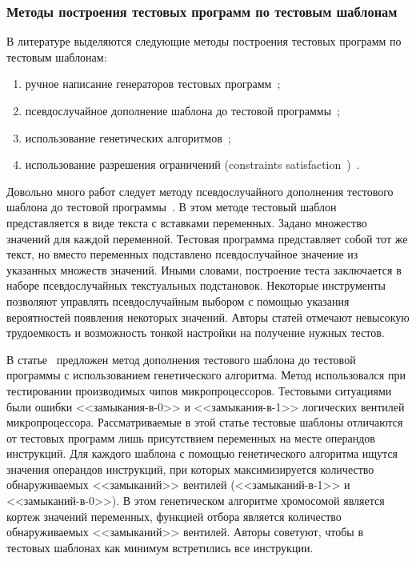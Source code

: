 \subsubsection{Методы построения тестовых программ по тестовым шаблонам}%

В литературе выделяются следующие методы построения тестовых программ по тестовым шаблонам:
\begin{enumerate}
	\item ручное написание генераторов тестовых программ~\cite{MicroTESK};
	\item псевдослучайное дополнение шаблона до тестовой программы~\cite{SEGUE1, SEGUE2, PA-RISC, TSE, Theo, mVpGen};
	\item использование генетических алгоритмов~\cite{GeneticTemplates};
	\item использование разрешения ограничений (constraints satisfaction~\cite{CLPusingECLiPSe})~\cite{GenesysPro, GenesysPro2004Innovations, DeepTrans, RAVEN, MAATG}.
\end{enumerate}

Довольно много работ следует методу псевдослучайного дополнения тестового шаблона до тестовой программы~\cite{SEGUE1, SEGUE2, PA-RISC, TSE, Theo, mVpGen}. В этом методе тестовый шаблон представляется в виде текста с вставками переменных. Задано множество значений для каждой переменной. Тестовая программа представляет собой тот же текст, но вместо переменных подставлено псевдослучайное значение из указанных множеств значений. Иными словами, построение теста заключается в наборе псевдослучайных текстуальных подстановок. Некоторые инструменты позволяют управлять псевдослучайным выбором с помощью указания вероятностей появления некоторых значений. Авторы статей отмечают невысокую трудоемкость и возможность тонкой настройки на получение нужных тестов.

В статье~\cite{GeneticTemplates} предложен метод дополнения тестового шаблона до тестовой программы с использованием генетического алгоритма. Метод использовался при тестировании производимых чипов микропроцессоров. Тестовыми ситуациями были ошибки <<замыкания-в-0>> и <<замыкания-в-1>> логических вентилей микропроцессора. Рассматриваемые в этой статье тестовые шаблоны отличаются от тестовых программ лишь присутствием переменных на месте операндов инструкций. Для каждого шаблона с помощью генетического алгоритма ищутся значения операндов инструкций, при которых максимизируется количество обнаруживаемых <<замыканий>> вентилей (<<замыканий-в-1>> и <<замыканий-в-0>>). В этом генетическом алгоритме хромосомой является кортеж значений переменных, функцией отбора является количество обнаруживаемых <<замыканий>> вентилей. Авторы советуют, чтобы в тестовых шаблонах как минимум встретились все инструкции.

